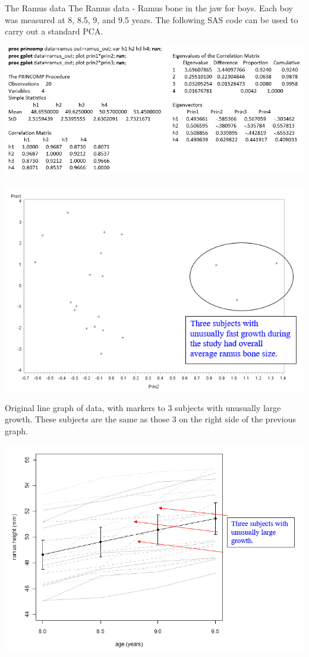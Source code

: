 \documentclass[
  9pt,
  ignorenonframetext,
]{beamer}
\begin{document}
\begin{frame}{The Ramus data}
\protect\hypertarget{the-ramus-data}{}
The Ramus data - Ramus bone in the jaw for boys. Each boy was measured
at 8, 8.5, 9, and 9.5 years. The following SAS code can be used to carry
out a standard PCA. \tiny

\begin{center}\includegraphics[width=0.86\linewidth]{figs_L2/f22} \end{center}

\tiny
\tiny

\begin{center}\includegraphics[width=0.5\linewidth]{figs_L2/f21} \end{center}

\tiny
\end{frame}

\begin{frame}{}
\protect\hypertarget{section-12}{}
Original line graph of data, with markers to 3 subjects with unusually
large growth. These subjects are the same as those 3 on the right side
of the previous graph.

\tiny

\begin{center}\includegraphics[width=0.95\linewidth]{figs_L2/f23} \end{center}

\tiny
\end{frame}
\end{document}
